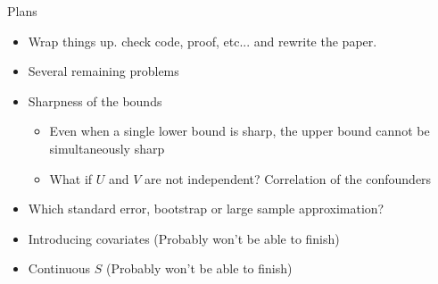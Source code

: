 \documentclass{beamer}					%
\begin{document}
\begin{frame}{Plans}
    \begin{itemize}
        \item Wrap things up. check code, proof, etc... and rewrite the paper.
        \item Several remaining problems
        \item  Sharpness of the bounds
        \begin{itemize}
            \item Even when a single lower bound is sharp, the upper bound cannot be simultaneously sharp
            \item What if $U$ and $V$ are not independent? Correlation of the confounders
        \end{itemize}
        \item Which standard error, bootstrap or large sample approximation?
        \item Introducing covariates (Probably won't be able to finish)
        \item Continuous $S$ (Probably won't be able to finish)
    \end{itemize}
\end{frame}
\end{document}
